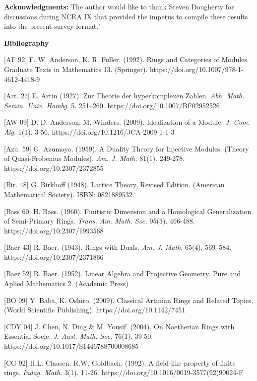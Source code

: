 \documentclass[11pt]{article}
\theoremstyle{plain}
\theoremstyle{remark}
\theoremstyle{plain}
\begin{document}
\textbf{Acknowledgments:} 
The author would like to thank Steven Dougherty for discussions during NCRA IX that provided the impetus to compile these results into the present survey format."






\bigskip 



\noindent \textbf{Bibliography}

[AF 92] F.  W. Anderson, K. R. Fuller. (1992). Rings and Categories of Modules. Graduate Texts in Mathematics 13. (Springer). https://doi.org/10.1007/978-1-4612-4418-9


[Art. 27] E. Artin (1927). Zur Theorie der hyperkomplexen Zahlen. \textit{Abh. Math. Semin. Univ. Hambg}. 5. 251–260. https://doi.org/10.1007/BF02952526 

[AW 09] D. D. Anderson, M. Winders. (2009). Idealization of a Module. \textit{J. Com. Alg.} 1(1). 3-56. https://doi.org/10.1216/JCA-2009-1-1-3

[Azu. 59] G. Azumaya. (1959). A Duality Theory for Injective Modules. (Theory of Quasi-Frobenius Modules). \textit{Am. J. Math.} 81(1). 249-278. https://doi.org/10.2307/2372855

[Bir. 48] G. Birkhoff (1948). Lattice Theory, Revised Edition. (American Mathematical Society). ISBN: 0821889532.



[Bass 60] H. Bass. (1960). Finitistic Dimension and a Homological Generalization of Semi-Primary Rings. \textit{Trans. Am. Math. Soc.} 95(3). 466-488. https://doi.org/10.2307/1993568

[Baer 43] R. Baer. (1943). Rings with Duals. \textit{Am. J. Math}. 65(4). 569–584. https://doi.org/10.2307/2371866

[Baer 52] R. Baer. (1952). Linear Algebra
and Projective Geometry. Pure and Aplied Mathematics 2. (Academic Press) 

[BO 09] Y. Baba, K. Oshiro. (2009). Classical Artinian Rings and Related Topics. (World Scientific Publishing). https://doi.org/10.1142/7451 



[CDY 04] J. Chen, N. Ding \& M. Yousif. (2004). On Noetherian Rings with Essential Socle. \textit{J. Aust. Math. Soc.} 76(1). 39-50. https://doi.org/10.1017/S1446788700008685

[CG 92] H.L. Claasen,  R.W. Goldbach. (1992).  A field-like property of finite rings. \textit{Indag. Math}. 3(1). 11-26. https://doi.org/10.1016/0019-3577(92)90024-F
\end{document}
